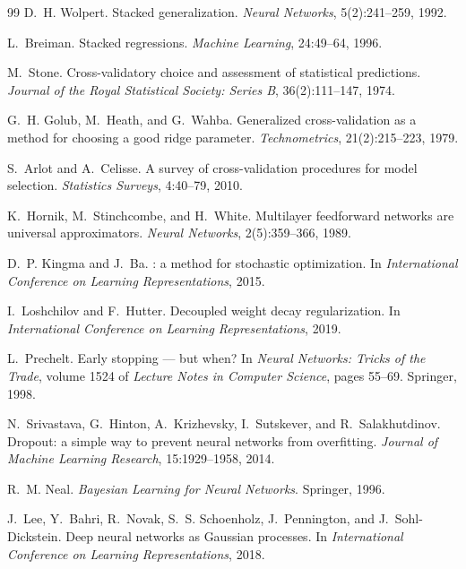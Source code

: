 \begin{thebibliography}{99}
D.~H. Wolpert.
\newblock Stacked generalization.
\newblock \emph{Neural Networks}, 5(2):241--259, 1992.

L.~Breiman.
\newblock Stacked regressions.
\newblock \emph{Machine Learning}, 24:49--64, 1996.

M.~Stone.
\newblock Cross-validatory choice and assessment of statistical predictions.
\newblock \emph{Journal of the Royal Statistical Society: Series B}, 36(2):111--147, 1974.

G.~H. Golub, M.~Heath, and G.~Wahba.
\newblock Generalized cross-validation as a method for choosing a good ridge parameter.
\newblock \emph{Technometrics}, 21(2):215--223, 1979.

S.~Arlot and A.~Celisse.
\newblock A survey of cross-validation procedures for model selection.
\newblock \emph{Statistics Surveys}, 4:40--79, 2010.

K.~Hornik, M.~Stinchcombe, and H.~White.
\newblock Multilayer feedforward networks are universal approximators.
\newblock \emph{Neural Networks}, 2(5):359--366, 1989.

D.~P. Kingma and J.~Ba.
: a method for stochastic optimization.
\newblock In \emph{International Conference on Learning Representations}, 2015.

I.~Loshchilov and F.~Hutter.
\newblock Decoupled weight decay regularization.
\newblock In \emph{International Conference on Learning Representations}, 2019.

L.~Prechelt.
\newblock Early stopping --- but when?
\newblock In \emph{Neural Networks: Tricks of the Trade}, volume 1524 of \emph{Lecture Notes
in Computer Science}, pages 55--69. Springer, 1998.

N.~Srivastava, G.~Hinton, A.~Krizhevsky, I.~Sutskever, and R.~Salakhutdinov.
\newblock Dropout: a simple way to prevent neural networks from overfitting.
\newblock \emph{Journal of Machine Learning Research}, 15:1929--1958, 2014.

R.~M. Neal.
\newblock \emph{Bayesian Learning for Neural Networks}.
\newblock Springer, 1996.

J.~Lee, Y.~Bahri, R.~Novak, S.~S. Schoenholz, J.~Pennington, and J.~Sohl-Dickstein.
\newblock Deep neural networks as {Gaussian} processes.
\newblock In \emph{International Conference on Learning Representations}, 2018.


\end{thebibliography}
